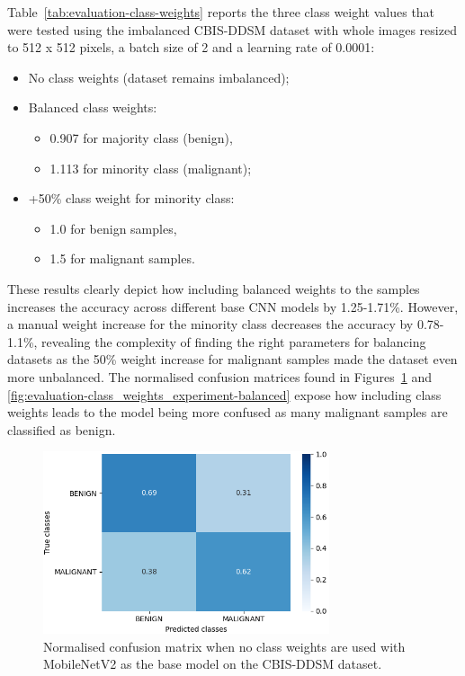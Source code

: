 Table~\ref{tab:evaluation-class-weights} reports the three class weight values that were tested using the imbalanced CBIS-DDSM dataset with whole images resized to 512 x 512 pixels, a batch size of 2 and a learning rate of 0.0001:
\begin{itemize}
    \item No class weights (dataset remains imbalanced);
    \item Balanced class weights:
    \begin{itemize}
        \item 0.907 for majority class (benign),
        \item 1.113 for minority class (malignant);
    \end{itemize}
    \item +50\% class weight for minority class:
    \begin{itemize}
        \item 1.0 for benign samples,
        \item 1.5 for malignant samples.
    \end{itemize}
\end{itemize}



These results clearly depict how including balanced weights to the samples increases the accuracy across different base CNN models by 1.25-1.71\%. However, a manual weight increase for the minority class decreases the accuracy by 0.78-1.1\%, revealing the complexity of finding the right parameters for balancing datasets as the 50\% weight increase for malignant samples made the dataset even more unbalanced. The normalised confusion matrices found in Figures~\ref{fig:evaluation-class_weights_experiment-none} and \ref{fig:evaluation-class_weights_experiment-balanced} expose how including class weights leads to the model being more confused as many malignant samples are classified as benign.

\begin{figure}[H]
\centerline{\includegraphics[width=0.75\textwidth]{figures/evaluation/class_weights_experiment/none.png}}
\caption{\label{fig:evaluation-class_weights_experiment-none}Normalised confusion matrix when no class weights are used with MobileNetV2 as the base model on the CBIS-DDSM dataset.}
\end{figure}

